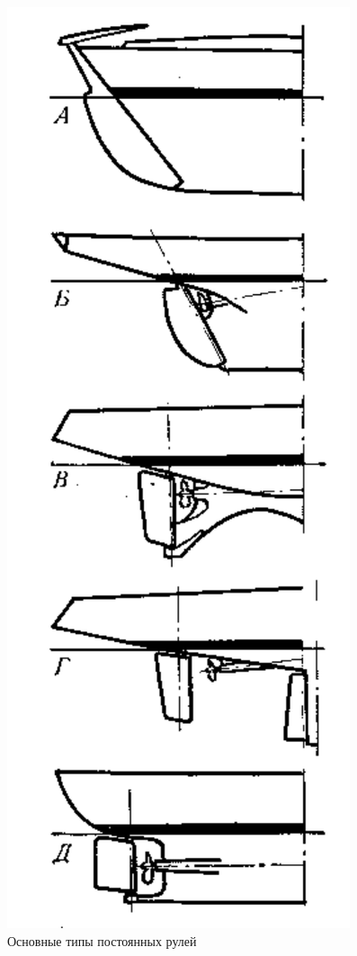 \documentclass[a4paper, 12pt, twoside, final]{scrbook}
\begin{document}
\begin{figure}%
\begin{centering}
\includegraphics{Postoyannye_ruli}
\par\end{centering}

\protect\caption{\label{fig:30}Основные типы постоянных рулей}


\end{figure}%
\end{document}
